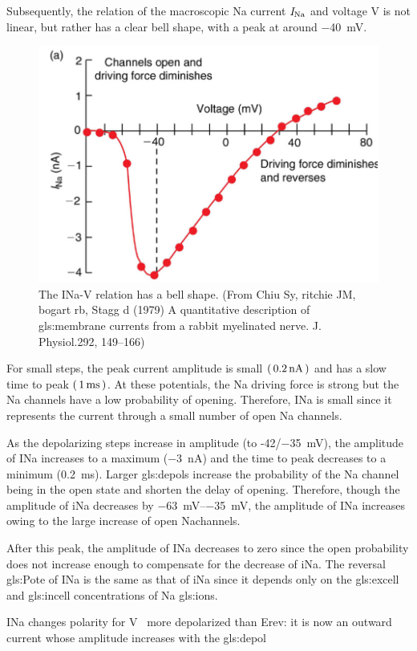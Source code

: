 \documentclass[class={myRUCProject}, crop=false]{standalone}
\begin{document}
Subsequently, the relation of the macroscopic \gls{Na} current \(\unit{\cur\sodium}\) and voltage \(\unit{\V}\) is not linear, but rather has a clear bell shape, with a peak at around \qty{-40}{\mV}. 
\begin{figure}[H]
    \centering
    \includegraphics[width=0.5\linewidth]{Pictures//Anakin/I-V.bell.png}
    \caption{The INa-V relation has a bell shape. (From Chiu Sy, ritchie JM, bogart rb, Stagg d (1979) A quantitative description of \gls{gls:membrane} currents from a rabbit myelinated nerve. J. Physiol.292, 149–166)}
    \label{fig:enter-label}
\end{figure}
 
For small steps, the peak current amplitude is small \(\br{\qty{0.2}{\nano\ampere}}\) and has a slow time to peak \(\br{\qty{1}{\milli\second}}\). At these potentials, the \gls{Na} driving force is strong but the \gls{Na} channels have a low probability of opening. Therefore, INa is small since it represents the current through a small number of open \gls{Na} channels. 

As the depolarizing steps increase in amplitude (to -42/\qty{-35}{\mV}), the amplitude of INa increases to a maximum (\qty{-3}{\nA}) and the time to peak decreases to a minimum (\qty{0.2}{\ms}). Larger \glspl{gls:depol} increase the probability of the \gls{Na} channel being in the open state and shorten the delay of opening. Therefore, though the amplitude of iNa decreases by \qtyrange{-63}{-35}{\mV}, the amplitude of INa increases owing to the large increase of open \gls{Na}channels. 

After this peak, the amplitude of INa decreases to zero since the open probability does not increase enough to compensate for the decrease of iNa. The reversal \gls{gls:Pote} of INa is the same as that of iNa since it depends only on the \gls{gls:excell} and \gls{gls:incell} concentrations of \gls{Na} \glspl{gls:ion}.

INa changes polarity for \unit{\V\membrane} more depolarized than Erev: it is now an outward current whose amplitude increases with the \gls{gls:depol} 
\end{document}
